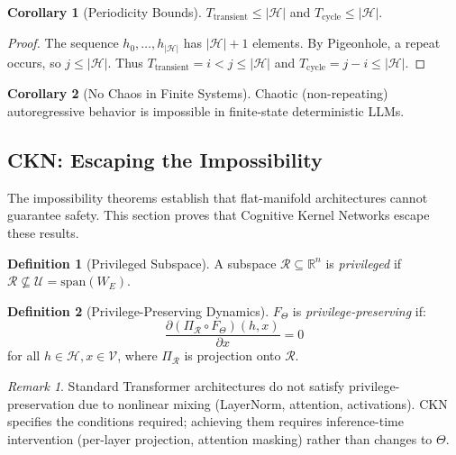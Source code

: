 \documentclass[11pt]{article}
\theoremstyle{definition}
\newtheorem{definition}{Definition}[section]
\newtheorem{corollary}{Corollary}[theorem]
\theoremstyle{remark}
\newtheorem{remark}{Remark}[section]
\begin{document}
\begin{corollary}[Periodicity Bounds]
$T_{\text{transient}} \leq |\mathcal{H}|$ and $T_{\text{cycle}} \leq |\mathcal{H}|$.
\end{corollary}

\begin{proof}
The sequence $h_0, \ldots, h_{|\mathcal{H}|}$ has $|\mathcal{H}| + 1$ elements. By Pigeonhole, a repeat occurs, so $j \leq |\mathcal{H}|$. Thus $T_{\text{transient}} = i < j \leq |\mathcal{H}|$ and $T_{\text{cycle}} = j - i \leq |\mathcal{H}|$.
\end{proof}

\begin{corollary}[No Chaos in Finite Systems]
Chaotic (non-repeating) autoregressive behavior is impossible in finite-state deterministic LLMs.
\end{corollary}

\subsection{CKN: Escaping the Impossibility}

The impossibility theorems establish that flat-manifold architectures cannot guarantee safety. This section proves that Cognitive Kernel Networks escape these results.

\begin{definition}[Privileged Subspace]
A subspace $\mathcal{R} \subseteq \mathbb{R}^n$ is \emph{privileged} if $\mathcal{R} \not\subseteq \mathcal{U} = \mathrm{span}(W_E)$.
\end{definition}

\begin{definition}[Privilege-Preserving Dynamics]
$F_\Theta$ is \emph{privilege-preserving} if:
\begin{equation}
\frac{\partial (\Pi_\mathcal{R} \circ F_\Theta)(h, x)}{\partial x} = 0
\end{equation}
for all $h \in \mathcal{H}, x \in \mathcal{V}$, where $\Pi_\mathcal{R}$ is projection onto $\mathcal{R}$.
\end{definition}

\begin{remark}
Standard Transformer architectures do not satisfy privilege-preservation due to nonlinear mixing (LayerNorm, attention, activations). CKN specifies the conditions required; achieving them requires inference-time intervention (per-layer projection, attention masking) rather than changes to $\Theta$.
\end{remark}
\end{document}

